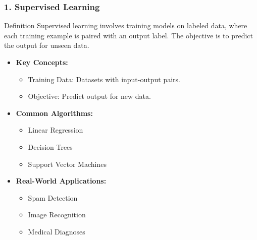 \documentclass[aspectratio=169]{beamer}
\begin{document}
\begin{frame}[fragile]
    \frametitle{1. Supervised Learning}
    \begin{block}{Definition}
        Supervised learning involves training models on labeled data, where each training example is paired with an output label. The objective is to predict the output for unseen data.
    \end{block}
    
    \begin{itemize}
        \item \textbf{Key Concepts:}
        \begin{itemize}
            \item Training Data: Datasets with input-output pairs.
            \item Objective: Predict output for new data.
        \end{itemize}
        
        \item \textbf{Common Algorithms:}
        \begin{itemize}
            \item Linear Regression
            \item Decision Trees
            \item Support Vector Machines
        \end{itemize}
        
        \item \textbf{Real-World Applications:}
        \begin{itemize}
            \item Spam Detection
            \item Image Recognition
            \item Medical Diagnoses
        \end{itemize}
    \end{itemize}
\end{frame}
\end{document}
